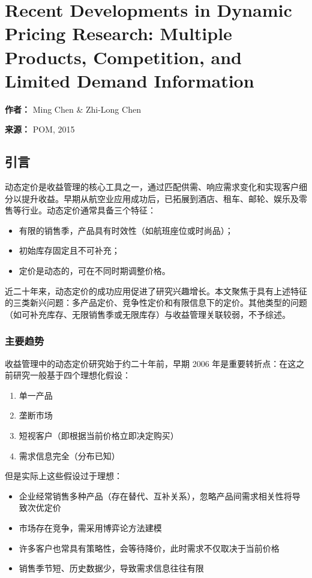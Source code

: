 \section{Recent Developments in Dynamic Pricing Research: Multiple	Products, Competition, and Limited Demand	Information}

\textbf{作者：} Ming Chen  \&  Zhi-Long Chen

\textbf{来源：} POM, 2015


\subsection{引言}\label{introduction}

动态定价是收益管理的核心工具之一，通过匹配供需、响应需求变化和实现客户细分以提升收益。早期从航空业应用成功后，已拓展到酒店、租车、邮轮、娱乐及零售等行业。动态定价通常具备三个特征：
\begin{itemize}
	\item 有限的销售季，产品具有时效性（如航班座位或时尚品）；
	\item 初始库存固定且不可补充；
	\item 定价是动态的，可在不同时期调整价格。
\end{itemize}

近二十年来，动态定价的成功应用促进了研究兴趣增长。本文聚焦于具有上述特征的三类新兴问题：多产品定价、竞争性定价和有限信息下的定价。其他类型的问题（如可补充库存、无限销售季或无限库存）与收益管理关联较弱，不予综述。

\subsubsection{主要趋势}\label{major-trends}

收益管理中的动态定价研究始于约二十年前，早期 2006 年是重要转折点：在这之前研究一般基于四个理想化假设：
\begin{enumerate}
	\def\labelenumi{\roman{enumi}.}
	\item 单一产品
	\item 垄断市场
	\item 短视客户（即根据当前价格立即决定购买）
	\item 需求信息完全（分布已知）
\end{enumerate}

但是实际上这些假设过于理想：
\begin{itemize}
	\item 企业经常销售多种产品（存在替代、互补关系），忽略产品间需求相关性将导致次优定价
	\item 市场存在竞争，需采用博弈论方法建模
	\item 许多客户也常具有策略性，会等待降价，此时需求不仅取决于当前价格
	\item 销售季节短、历史数据少，导致需求信息往往有限
\end{itemize}

